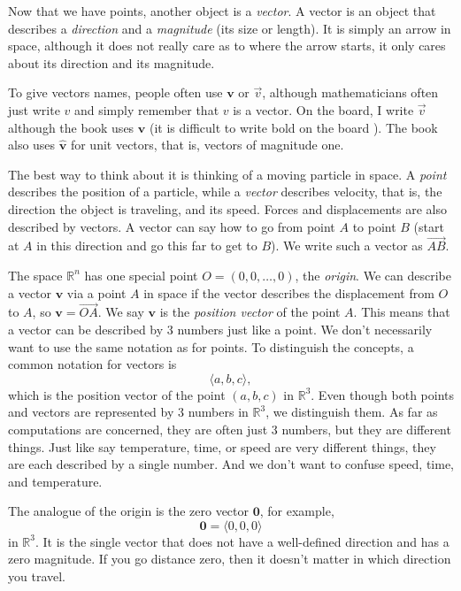 \documentclass[12pt]{article}
\newcommand{\R}{{\mathbb{R}}}
\begin{document}
Now that we have points, another object is a \emph{vector}.
A vector is an object that describes a \emph{direction} and a \emph{magnitude} (its size or length).
It is simply an arrow in space,
although it does not really care as to where the arrow starts,
it only cares about its direction and its magnitude.

To give vectors names, people often use
$\mathbf{v}$ or $\vec{v}$, although mathematicians often just write $v$ and simply remember
that $v$ is a vector.
On the board, I write $\vec{v}$ although the book uses $\mathbf{v}$
(it is difficult to write bold on the board \Smiley{}).
The book also uses $\hat{\mathbf{v}}$ for unit vectors, that is,
vectors of magnitude one.

The best way to think about it is thinking of a moving particle in space.
A \emph{point} describes the position of a particle,
while a \emph{vector} describes velocity, that is, the direction the object is traveling, and its speed.
Forces and displacements are also described by vectors.
A vector can say how to go from point $A$ to point $B$
(start at $A$ in this direction and go this far to get to $B$).
We write such a vector as $\overrightarrow{AB}$.

The space $\R^n$ has one special point $O = (0,0,\ldots,0)$, the \emph{origin}.
We can describe a vector $\mathbf{v}$ via a point $A$ in space if the vector describes the
displacement from $O$ to $A$, so $\mathbf{v} = \overrightarrow{OA}$.
We say $\mathbf{v}$ is the \emph{position vector} of the point $A$.
This means that a vector can be described by 3 numbers just like a point.
We don't necessarily want to use the same notation as for points.
To distinguish the concepts,
a common notation for vectors is
\[
\langle a,b,c \rangle ,
\]
which is the position vector of the point $(a,b,c)$ in $\R^3$.
Even though both points and vectors are represented by 3 numbers in $\R^3$,
we distinguish them.
As far as computations are concerned,
they are often just 3 numbers, but they are different things.
Just like say temperature, time, or speed are very different
things, they are each described by a single number.  And we don't want to
confuse speed, time, and temperature.

The analogue of the origin is the zero vector $\mathbf{0}$, for example,
\[
\mathbf{0} = \langle 0,0,0 \rangle
\]
in $\R^3$.
It is the single vector that does not have a well-defined direction
and has a zero magnitude.
If you go distance zero, then it doesn't matter in which direction
you travel.
\end{document}
